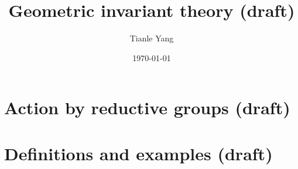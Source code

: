 \documentclass[sectionlevel=chapter]{noteformyself}
\title{Geometric invariant theory (draft)}
\author{Tianle Yang}
\date{\today}
\begin{document}
    \maketitle

    \tableofcontents

    \section{Action by reductive groups (draft)}
    
    \section{Definitions and examples (draft)}
    

    \printbibliography[heading=bibintoc, title={References}]
    
\end{document}
